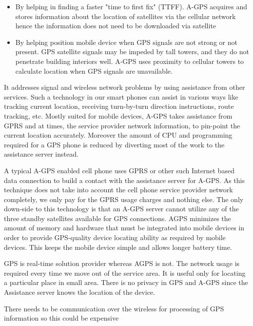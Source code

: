 \documentclass[12pt,a4paper,times]{report}
\begin{document}
	\begin{itemize}
	\item By helping in finding a faster "time to first fix" 
	(TTFF). A-GPS acquires and stores information about 
	the location of satellites via the cellular network hence 
	the information does not need to be downloaded via 
	satellite
	\item By helping position mobile device when GPS signals 
	are not strong or not present. GPS satellite signals may 
	be impeded by tall towers, and they do not penetrate 
	building interiors well. A-GPS uses proximity to 
	cellular towers to calculate location when GPS signals 
	are unavailable. 
	\end{itemize}
	
	It addresses signal and wireless network problems by using 
	assistance from other services. Such a technology in our 
	smart phones can assist in various ways like tracking 
	current location, receiving turn-by-turn direction 
	instructions, route tracking, etc. Mostly suited for mobile devices, A-GPS takes assistance 
	from GPRS and at times, the service provider network 
	information, to pin-point the current location accurately. 
	Moreover the amount of CPU and programming required 
	for a GPS phone is reduced by diverting most of the work 
	to the assistance server instead. 
	
	A typical A-GPS enabled cell phone uses GPRS or other 
	such Internet based data connection to build a contact with 
	the assistance server for A-GPS. As this technique does 
	not take into account the cell phone service provider 
	network completely, we only pay for the GPRS usage 
	charges and nothing else. The only down-side to this 
	technology is that an A-GPS server cannot utilize any of 
	the three standby satellites available for GPS connections. 
	AGPS minimizes the amount of memory and hardware 
	that must be integrated into mobile devices in order to 
	provide GPS-quality device locating ability as required by 
	mobile devices. This keeps the mobile device simple and 
	allows longer battery time.
	
	GPS is real-time solution provider whereas AGPS is not. 
	The network usage is required every time we move out of 
	the service area. It is useful only for locating a particular 
	place in small area. There is no privacy in GPS and A-GPS 
	since the Assistance server knows the location of the 
	device. 
	
	There needs to be communication over the wireless for 
	processing of GPS information so this could be expensive
	
\end{document}
